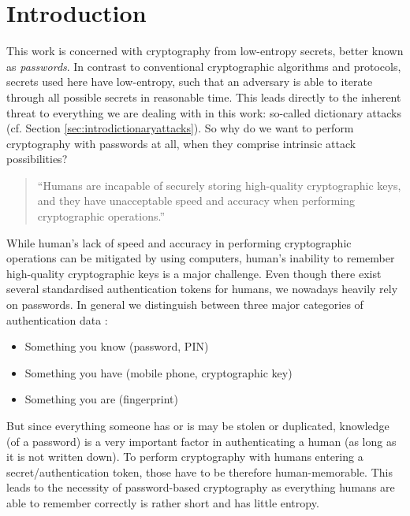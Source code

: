 
\chapter{Introduction}\label{ch:intro}  %

\ifpdf
    \graphicspath{{Chapters/Figs/Raster/}{Chapters/Figs/PDF/}{Chapters/Figs/}}
\else
    \graphicspath{{Chapters/Figs/Vector/}{Chapters/Figs/}}
\fi

This work is concerned with cryptography from low-entropy secrets, better known as \emph{passwords}.
In contrast to conventional cryptographic algorithms and protocols, secrets used here have low-entropy, such that an adversary is able to iterate through all possible secrets in reasonable time.
This leads directly to the inherent threat to everything we are dealing with in this work: so-called dictionary attacks (cf. Section \ref{sec:introdictionaryattacks}).
So why do we want to perform cryptography with passwords at all, when they comprise intrinsic attack possibilities?

\begin{quote}
``Humans are incapable of securely storing high-quality cryptographic keys, and they have unacceptable speed and accuracy when performing cryptographic operations.''~\citet{Kaufmann02}
\end{quote}

\noindent
While human's lack of speed and accuracy in performing cryptographic operations can be mitigated by using computers, human's inability to remember high-quality cryptographic keys is a major challenge.
Even though there exist several standardised authentication tokens for humans, we nowadays heavily rely on passwords.
In general we distinguish between three major categories of authentication data \cite{Burr11}:
\begin{itemize}
	\item Something you know (\eg password, \ac{PIN})
	\item Something you have (\eg mobile phone, cryptographic key)
	\item Something you are (\eg fingerprint)
\end{itemize}
But since everything someone has or is may be stolen or duplicated, knowledge (of a password) is a very important factor in authenticating a human (as long as it is not written down).
To perform cryptography with humans entering a secret/authentication token, those have to be therefore human-memorable.
This leads to the necessity of password-based cryptography as everything humans are able to remember correctly is rather short and has little entropy.

